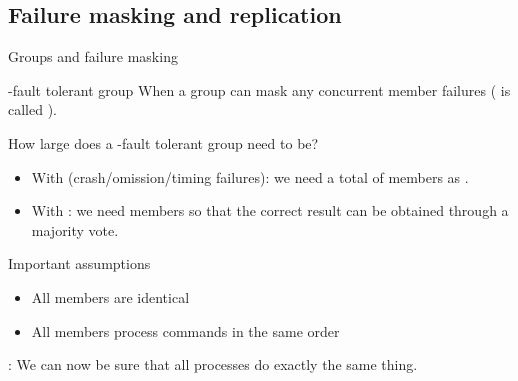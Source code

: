 \subsection{Failure masking and replication}
\begin{slide}{Groups and failure masking}
  \begin{block}{-fault tolerant group}
    When a group can mask any  concurrent member failures ( is called ).
  \end{block}
  \begin{alertblock}{How large does a -fault tolerant group need to be?}
    \begin{itemize}
    \item With  (crash/omission/timing failures): we need a total of 
      members as .
    \item With : we need  members so that the correct result can be
      obtained through a majority vote.
    \end{itemize}
  \end{alertblock}
  \begin{block}{Important assumptions}
    \begin{itemize}\tightlist
    \item All members are identical
    \item All members process commands in the same order 
    \end{itemize}
    : We can now be sure that all processes do exactly the same thing.
  \end{block}
\end{slide}
